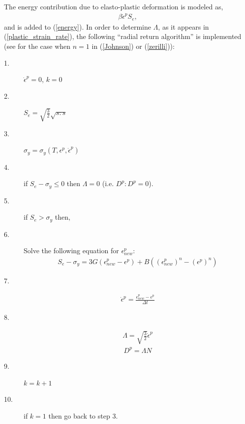\documentclass[]{article}
\begin{document}
The energy contribution due to elasto-plastic deformation is modeled as,
\begin{eqnarray}
	\beta\dot{\epsilon}^{p}S_{e},
\end{eqnarray}
and is added to (\ref{energy}).  In order to determine $\Lambda$, as it
appears in (\ref{plastic_strain_rate}), the following ``radial
return algorithm'' is implemented 
(see \cite{tran2004particle} for the case when $n=1$ in (\ref{Johnson})
or (\ref{zerilli})):
\begin{description}
\item[1.] $\dot{\epsilon}^{p}=0$, $k=0$
\item[2.] $S_{e}=\sqrt{\frac{3}{2}}\sqrt{s:s}$
\item[3.] $\sigma_{y}=\sigma_{y}(T,\epsilon^{p},\dot{\epsilon}^{p})$
\item[4.]
	if $S_{e}-\sigma_{y}\le 0$ then $\Lambda=0$ (i.e. $D^{p}:D^{p}=0$).
\item[5.]
	if $S_{e}>\sigma_{y}$ then,
\item[6.]
	Solve the following equation for $\epsilon^{p}_{new}$:
        \begin{eqnarray}
		S_{e}-\sigma_{y}=3G(\epsilon^{p}_{new}-\epsilon^{p})+
		B((\epsilon^{p}_{new})^{n}-
		  (\epsilon^{p})^{n})
        \end{eqnarray}
\item[7.] 
	 \begin{eqnarray}
		 \dot{\epsilon}^{p}=\frac{
			 \epsilon^{p}_{new}-\epsilon^{p}}{\Delta t}
	 \end{eqnarray}
\item[8.] 
	 \begin{eqnarray}
		 \Lambda=\sqrt{\frac{3}{2}}\dot{\epsilon}^{p}
	 \end{eqnarray}
	 \begin{eqnarray}
		 D^{p}=\Lambda N
	 \end{eqnarray}
\item[9.] $k=k+1$
\item[10.] if $k=1$ then go back to step 3.
\end{description}
\end{document}
